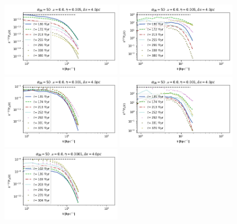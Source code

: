\documentclass[iop,apj,numberedappendix,twocolappendix]{emulateapj}
\begin{document}
\begin{figure}
\centering
\includegraphics[trim=0.0cm 0.00cm 0.0cm 0.0cm,clip=true,width=0.45\textwidth]{csc_figs/4pcPm0e-2_3Bpower.png}
\includegraphics[trim=0.0cm 0.00cm 0.0cm 0.0cm,clip=true,width=0.45\textwidth]{csc_figs/4pcPm0e-2_3kpower.png}
\includegraphics[trim=0.0cm 0.00cm 0.0cm 0.0cm,clip=true,width=0.45\textwidth]{csc_figs/4pcPm0e-3_0Bpower.png}
\includegraphics[trim=0.0cm 0.00cm 0.0cm 0.0cm,clip=true,width=0.45\textwidth]{csc_figs/4pcPm0e-3_0kpower.png}
\includegraphics[trim=0.0cm 0.00cm 0.0cm 0.0cm,clip=true,width=0.45\textwidth]{csc_figs/4pcPm0e-4_0Bpower.png}

\end{figure}
\end{document}
